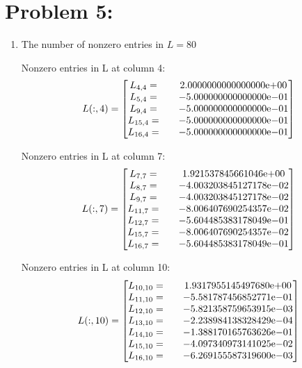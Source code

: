 \newpage
\section*{Problem 5:}
\begin{enumerate}
\item 
The number of nonzero entries in $L =80$ 

Nonzero entries in L at column 4:
$$
L(:,4) = 
\begin{bmatrix}
L_{4,4}=  & \quad {2.0000000000000000}\mathrm{e}{+00}\\
L_{5,4}=  & \quad {-5.000000000000000}\mathrm{e}{-01}\\
L_{9,4}=  & \quad {-5.000000000000000}\mathrm{e}{-01}\\
L_{15,4}= & \quad {-5.000000000000000}\mathrm{e}{-01}\\
L_{16,4}= & \quad {-5.000000000000000}\mathrm{e}{-01}\\
\end{bmatrix}
$$

Nonzero entries in L at column 7:
$$
L(:,7) = 
\begin{bmatrix}
L_{7,7}=  & \quad {1.921537845661046}\mathrm{e}{+00}\\
L_{8,7}=  & \quad {-4.003203845127178}\mathrm{e}{-02}\\
L_{9,7}=  & \quad {-4.003203845127178}\mathrm{e}{-02}\\
L_{11,7}= & \quad {-8.006407690254357}\mathrm{e}{-02}\\
L_{12,7}= & \quad {-5.604485383178049}\mathrm{e}{-01}\\
L_{15,7}= & \quad {-8.006407690254357}\mathrm{e}{-02}\\
L_{16,7}= & \quad {-5.604485383178049}\mathrm{e}{-01}\\
\end{bmatrix}
$$

Nonzero entries in L at column 10:
$$
L(:,10) = 
\begin{bmatrix}
L_{10,10}= & \quad {1.9317955145497680}\mathrm{e}{+00}\\
L_{11,10}= & \quad {-5.581787456852771}\mathrm{e}{-01}\\
L_{12,10}= & \quad {-5.821358759653915}\mathrm{e}{-03}\\
L_{13,10}= & \quad {-2.238984138328429}\mathrm{e}{-04}\\
L_{14,10}= & \quad {-1.388170165763626}\mathrm{e}{-01}\\
L_{15,10}= & \quad {-4.097340973141025}\mathrm{e}{-02}\\
L_{16,10}= & \quad {-6.269155587319600}\mathrm{e}{-03}\\
\end{bmatrix}
$$


\end{enumerate}
